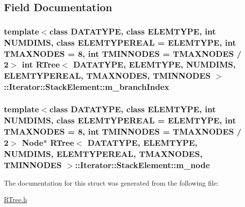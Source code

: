 \subsection{Field Documentation}
\hypertarget{structRTree_1_1Iterator_1_1StackElement_a2101e49f2ac3911fa909a1779485d8f4}{
\subsubsection[{m\-\_\-branch\-Index}]{\setlength{\rightskip}{0pt plus 5cm}template$<$class D\-A\-T\-A\-T\-Y\-P\-E, class E\-L\-E\-M\-T\-Y\-P\-E, int N\-U\-M\-D\-I\-M\-S, class E\-L\-E\-M\-T\-Y\-P\-E\-R\-E\-A\-L = E\-L\-E\-M\-T\-Y\-P\-E, int T\-M\-A\-X\-N\-O\-D\-E\-S = 8, int T\-M\-I\-N\-N\-O\-D\-E\-S = T\-M\-A\-X\-N\-O\-D\-E\-S / 2$>$ int {\bf R\-Tree}$<$ D\-A\-T\-A\-T\-Y\-P\-E, E\-L\-E\-M\-T\-Y\-P\-E, N\-U\-M\-D\-I\-M\-S, E\-L\-E\-M\-T\-Y\-P\-E\-R\-E\-A\-L, T\-M\-A\-X\-N\-O\-D\-E\-S, T\-M\-I\-N\-N\-O\-D\-E\-S $>$\-::Iterator\-::\-Stack\-Element\-::m\-\_\-branch\-Index}}\label{structRTree_1_1Iterator_1_1StackElement_a2101e49f2ac3911fa909a1779485d8f4}
\hypertarget{structRTree_1_1Iterator_1_1StackElement_a915f96106d5c78e14209c4d5e83ee756}{
\subsubsection[{m\-\_\-node}]{\setlength{\rightskip}{0pt plus 5cm}template$<$class D\-A\-T\-A\-T\-Y\-P\-E, class E\-L\-E\-M\-T\-Y\-P\-E, int N\-U\-M\-D\-I\-M\-S, class E\-L\-E\-M\-T\-Y\-P\-E\-R\-E\-A\-L = E\-L\-E\-M\-T\-Y\-P\-E, int T\-M\-A\-X\-N\-O\-D\-E\-S = 8, int T\-M\-I\-N\-N\-O\-D\-E\-S = T\-M\-A\-X\-N\-O\-D\-E\-S / 2$>$ {\bf Node}$\ast$ {\bf R\-Tree}$<$ D\-A\-T\-A\-T\-Y\-P\-E, E\-L\-E\-M\-T\-Y\-P\-E, N\-U\-M\-D\-I\-M\-S, E\-L\-E\-M\-T\-Y\-P\-E\-R\-E\-A\-L, T\-M\-A\-X\-N\-O\-D\-E\-S, T\-M\-I\-N\-N\-O\-D\-E\-S $>$\-::Iterator\-::\-Stack\-Element\-::m\-\_\-node}}\label{structRTree_1_1Iterator_1_1StackElement_a915f96106d5c78e14209c4d5e83ee756}


The documentation for this struct was generated from the following file\-:\begin{DoxyCompactItemize}
\item 
\hyperlink{RTree_8h}{R\-Tree.\-h}\end{DoxyCompactItemize}
